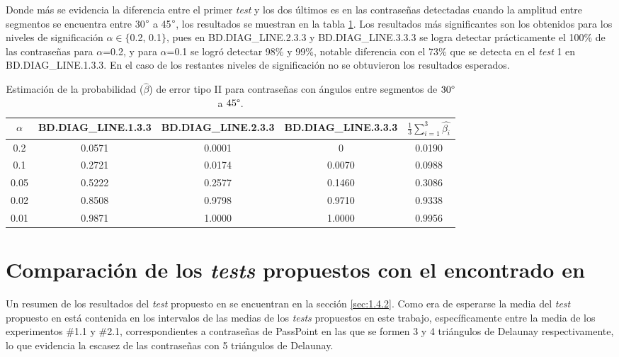 \documentclass[12pt]{report}
\begin{document}
Donde más se evidencia la diferencia entre  el primer \textit{test} y los dos últimos es en las contraseñas detectadas cuando la amplitud entre segmentos se encuentra entre 30$\degree$ a 45$\degree$, los resultados se muestran en la tabla \ref{tab:error2-30-45}. Los resultados más significantes son los obtenidos para los niveles de significación $\alpha \in \{$0.2, 0.1$\}$, pues en   BD.DIAG\_LINE.2.3.3 y BD.DIAG\_LINE.3.3.3  se logra detectar prácticamente el 100\% de las contraseñas para $\alpha$=0.2, y para $\alpha$=0.1 se logró detectar 98\% y 99\%, notable diferencia con el 73\% que se detecta en el \textit{test} 1 en BD.DIAG\_LINE.1.3.3. En el caso de los restantes niveles de significación no se obtuvieron los resultados esperados.
\begin{table}[h!]
	\centering
	\caption{Estimación de la probabilidad ($\hat{\beta}$) de error tipo II para contraseñas con ángulos entre segmentos de $30\degree$ a $45\degree$.}
	\begin{tabular}{|c|ccc|c|}
		\hline
		$\alpha$& BD.DIAG\_LINE.1.3.3 & BD.DIAG\_LINE.2.3.3 & BD.DIAG\_LINE.3.3.3 &$\frac{1}{3} \sum_{i=1}^{3} \hat{\beta_i}$ \\
		\hline
		0.2 & 0.0571     & 0.0001     & 0        &   0.0190   \\
		0.1 & 0.2721      & 0.0174    & 0.0070    &  0.0988  \\
		0.05& 0.5222    & 0.2577     & 0.1460     &  0.3086  \\
		0.02& 0.8508     & 0.9798    & 0.9710     &   0.9338  \\
		0.01& 0.9871     & 1.0000     & 1.0000   &   0.9956  \\
		\hline
	\end{tabular}

	\label{tab:error2-30-45}
\end{table}


\section{Comparación de los \textit{tests} propuestos con el encontrado en  \cite{13}}
Un resumen de los resultados del \textit{test} propuesto en \cite{13} se encuentran en la sección \ref{sec:1.4.2}. Como era de esperarse la media del \textit{test} propuesto en \cite{13} está contenida en los intervalos de las medias de los \textit{tests} propuestos en este trabajo, específicamente entre la media de los experimentos \#1.1 y \#2.1, correspondientes a contraseñas de PassPoint en las que se formen 3 y 4 triángulos de Delaunay respectivamente, lo que evidencia la escasez de las contraseñas con 5 triángulos de Delaunay.
\end{document}

